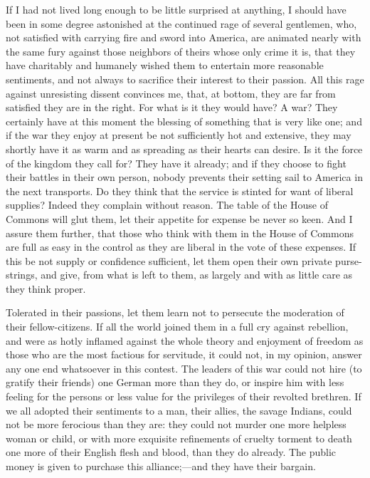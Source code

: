 If I had not lived long enough to be little surprised at anything, I should have been in some degree astonished at the continued rage of several gentlemen, who, not satisfied with carrying fire and sword into America, are animated nearly with the same fury against those neighbors of theirs whose only crime it is, that they have charitably and humanely wished them to entertain more reasonable sentiments, and not always to sacrifice their interest to their passion. All this rage against unresisting dissent convinces me, that, at bottom, they are far from satisfied they are in the right. For what is it they would have? A war? They certainly have at this moment the blessing of something that is very like one; and if the war they enjoy at present be not sufficiently hot and extensive, they may shortly have it as warm and as spreading as their hearts can desire. Is it the force of the kingdom they call for? They have it already; and if they choose to fight their battles in their own person, nobody prevents their setting sail to America in the next transports. Do they think that the service is stinted for want of liberal supplies? Indeed they complain without reason. The table of the House of Commons will glut them, let their appetite for expense be never so keen. And I assure them further, that those who think with them in the House of Commons are full as easy in the control as they are liberal in the vote of these expenses. If this be not supply or confidence sufficient, let them open their own private purse-strings, and give, from what is left to them, as largely and with as little care as they think proper.

Tolerated in their passions, let them learn not to persecute the moderation of their fellow-citizens. If all the world joined them in a full cry against rebellion, and were as hotly inflamed against the whole theory and enjoyment of freedom as those who are the most factious for servitude, it could not, in my opinion, answer any one end whatsoever in this contest. The leaders of this war could not hire (to gratify their friends) one German more than they do, or inspire him with less feeling for the persons or less value for the privileges of their revolted brethren. If we all adopted their sentiments to a man, their allies, the savage Indians, could not be more ferocious than they are: they could not murder one more helpless woman or child, or with more exquisite refinements of cruelty torment to death one more of their English flesh and blood, than they do already. The public money is given to purchase this alliance;—and they have their bargain.

